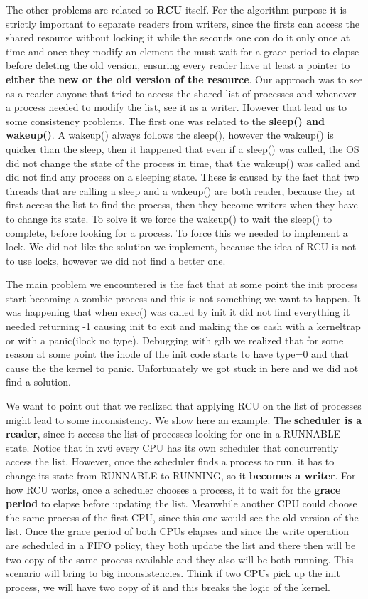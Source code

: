\documentclass[10pt,a4]{article}
\begin{document}
The other problems are related to \textbf{RCU} itself. For the algorithm purpose it is strictly important to separate readers from writers, 
since the firsts can access the shared resource without locking it while the seconds one con do it only once at time and once they 
modify an element the must wait for a grace period to elapse before deleting the old version, 
ensuring every reader have at least a pointer to \textbf{either the new or the old version of the resource}.
Our approach was to see as a reader anyone that tried to access the shared list of processes 
and whenever a process needed to modify the list, see it as a writer. However that lead us to some consistency problems.
The first one was related to the \textbf{sleep() and wakeup()}. A wakeup() always follows the sleep(), 
however the wakeup() is quicker than the sleep, then it happened that even if a sleep() was called, 
the OS did not change the state of the process in time, that the wakeup() was called and did not find any process on a sleeping state. 
These is caused by the fact that two threads that are calling a sleep and a wakeup() are both reader, 
because they at first access the list to find the process, then they become writers when they have to change its state. 
To solve it we force the  wakeup() to wait the sleep()  to complete, before looking for a process. 
To force this we needed to implement a lock. We did not like the solution we implement, 
because the idea of RCU is not to use locks, however we did not find a better one.


The main problem we encountered is the fact that at some point the init process start becoming a zombie process 
and this is not something we want to happen. 
It was happening that when exec() was called by init it did not find everything it needed returning -1 
causing init to exit and making the os cash with a kerneltrap or with a panic(ilock no type). 
Debugging with gdb we realized that for some reason at some point the inode of the init code starts to have type=0 
and that cause the the kernel to panic. Unfortunately we got stuck in here and we did not find a solution.

We want to point out that we realized that applying RCU on the list of processes might lead to some inconsistency. 
We show here an example. 
The \textbf{scheduler is a reader}, since it access the list of processes looking for one in a RUNNABLE state. 
Notice that in xv6 every CPU has its own scheduler that concurrently access the list. 
However, once the scheduler finds a process to run, it has to change its state from RUNNABLE to RUNNING, so it \textbf{becomes a writer}. 
For how RCU works, once a scheduler chooses a process, it to wait for the \textbf{grace period} to elapse before updating the list. 
Meanwhile another CPU could choose the same process of the first CPU, since this one would see the old version of the list. 
Once the grace period of both CPUs elapses and since the write operation are scheduled in a FIFO policy, 
they both update the list and there then will be two copy of the same process available and they also will be both running. 
This scenario will bring to big inconsistencies. 
Think if two CPUs pick up the init process, we will have two copy of it and this breaks the logic of the kernel. 
\end{document}
